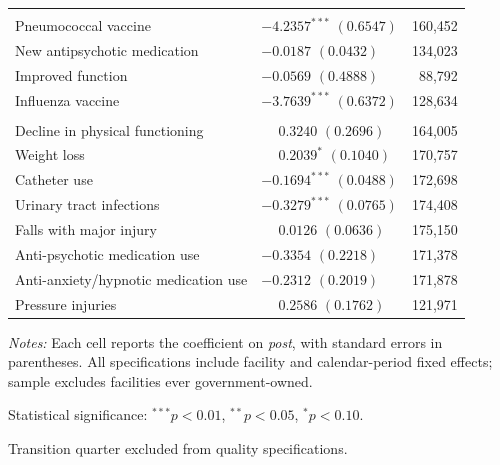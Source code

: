 \documentclass[11pt]{article}
\begin{document}
\begin{table}[!ht]
\begin{threeparttable}
\begin{tabularx}{\textwidth}{@{} l Y r @{}}
\addlinespace[4pt]
 \\[2pt]
Pneumococcal vaccine &  & 160,452 \\
New antipsychotic medication &  & 134,023 \\
Improved function &  & 88,792 \\
Influenza vaccine &  & 128,634 \\
\addlinespace[4pt]
 \\[2pt]
Decline in physical functioning &  & 164,005 \\
Weight loss &  & 170,757 \\
Catheter use &  & 172,698 \\
Urinary tract infections &  & 174,408 \\
Falls with major injury &  & 175,150 \\
Anti-psychotic medication use &  & 171,378 \\
Anti-anxiety/hypnotic medication use &  & 171,878 \\
Pressure injuries &  & 121,971 \\
\bottomrule
\end{tabularx}

\begin{tablenotes}[flushleft]
\footnotesize
\item \textit{Notes:} Each cell reports the coefficient on \textit{post}, with standard errors in parentheses. All specifications include facility and calendar-period fixed effects; sample excludes facilities ever government-owned.
\item Statistical significance: $^{***}p<0.01$, $^{**}p<0.05$, $^{*}p<0.10$.
\item Transition quarter excluded from quality specifications.
\end{tablenotes}
\end{threeparttable}
\end{table}
\end{document}
